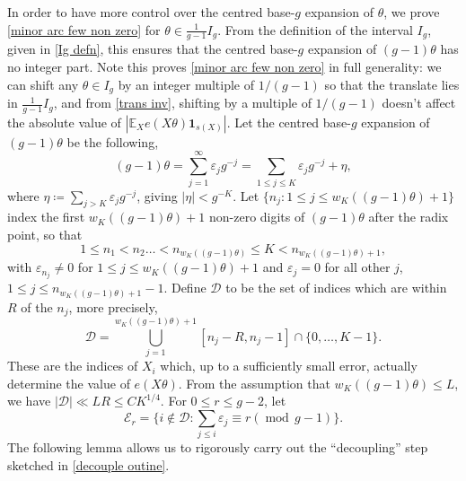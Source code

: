 \documentclass[hidelinks,11pt,reqno]{amsart}
\renewcommand{\leq}{\leqslant}
\newcommand{\E}{\ensuremath{\mathbb{E}}}
\newcommand{\st}{\ensuremath{:}}
\newcommand{\ind}{\mathbf{1}}
\newcommand{\xb}{X}
\newcommand{\sx}[1]{s(#1)}
\theoremstyle{remark}
\newcommand{\md}[1]{\ensuremath{(\operatorname{mod}\, #1)}}
\begin{document}
In order to have more control over the centred base-$g$ expansion of $\theta$, we prove \cref{minor arc few non zero} for 
$\theta\in \tfrac{1}{g-1}I_{g}$. From the definition of the interval $I_{g}$, given in \cref{Ig defn}, this ensures that the centred base-$g$ expansion of $(g-1)\theta$ has no integer part. Note this proves \cref{minor arc few non zero} in full generality: we can shift any $\theta \in I_{g}$ by an integer multiple of $1/(g-1)$ so that the translate lies in $\tfrac{1}{g-1}I_{g}$, and from \cref{trans inv}, shifting by a multiple of $1/(g-1)$ doesn't affect the absolute value of $|\E_{\xb}e(\xb\theta)\ind_{\sx{\xb}}|$. Let the centred base-$g$ expansion of $(g-1)\theta$ be the following, 
\begin{equation}\label{theta digit exp}
    (g-1)\theta=\sum_{j= 1}^{\infty}\varepsilon_{j}g^{-j}=\sum_{1\leq j \leq K}\varepsilon_{j}g^{-j}+\eta,
\end{equation}
where $\eta \coloneq \sum_{j>K}\varepsilon_{j}g^{-j}$, giving $|\eta|<g^{-K}$. Let $\{n_{j}\st1\leq j\leq w_{K}((g-1)\theta)+1\}$ index the first $w_{K}((g-1)\theta)+1$ non-zero digits of $(g-1)\theta$ after the radix point, so that \begin{equation}\label{n defn}
  1\leq n_{1}<n_{2}\ldots <n_{w_{K}((g-1)\theta)}\leq K<n_{w_{K}((g-1)\theta)+1},
\end{equation}
with $\varepsilon_{n_{j}}\neq0$ for $1\leq j\leq w_{K}((g-1)\theta)+1$ and $\varepsilon_{j}=0$ for all other $j$, $1\leq j\leq n_{w_{K}((g-1)\theta)+1}-1$.
Define $\mathcal{D}$ to be the set of indices which are within $R$ of the $n_{j}$, more precisely,
\begin{equation}\label{D set defn}
    \mathcal{D}=\bigcup_{j=1}^{w_{K}((g-1)\theta)+1}[n_{j}-R,n_{j}-1]\cap \{0,\ldots, K-1\}.
\end{equation}
These are the indices of $X_{i}$ which, up to a sufficiently small error, actually determine the value of $e(\xb\theta)$. From the assumption that $w_{K}((g-1)\theta)\leq L$, we have $|\mathcal{D}|\ll LR \leq CK^{1/4}$. For $0\leq r \leq g-2$, let 
\begin{equation}\label{E set defn}
    \mathcal{E}_{r}=\{i\notin \mathcal{D}\st \sum_{j\leq i}\varepsilon_{j}\equiv r \md{g-1}\}.
\end{equation}
The following lemma allows us to rigorously carry out the \enquote{decoupling} step sketched in \cref{decouple outine}.
\end{document}
